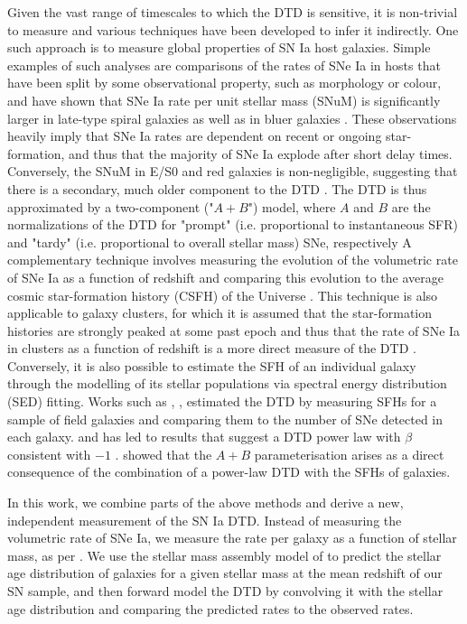 \documentclass[fleqn,usenatbib]{mnras}
\begin{document}
Given the vast range of timescales to which the DTD is sensitive, it is non-trivial to measure and various techniques have been developed to infer it indirectly. One such approach is to measure global properties of SN Ia host galaxies. Simple examples of such analyses are comparisons of the rates of SNe Ia in hosts that have been split by some observational property, such as morphology or colour, and have shown that SNe Ia rate per unit stellar mass (SNuM) is significantly larger in late-type spiral galaxies as well as in bluer galaxies \citep[e.g.][]{Mannucci2005}. These observations heavily imply that SNe Ia rates are dependent on recent or ongoing star-formation, and thus that the majority of SNe Ia explode after short delay times. Conversely, the SNuM in E/S0 and red galaxies is non-negligible, suggesting that there is a secondary, much older component to the DTD \citep{Sullivan2006,Smith2012}. The DTD is thus approximated by a two-component ("$A + B$") model, where $A$ and $B$ are the normalizations of the DTD for "prompt" (i.e. proportional to instantaneous SFR) and "tardy" (i.e. proportional to overall stellar mass) SNe, respectively A complementary technique involves measuring the evolution of the volumetric rate of SNe Ia as a function of redshift and comparing this evolution to the average cosmic star-formation history (CSFH) of the Universe \citep{Gal-Yam2004,Strolger2004,Dahlen2004,Dahlen2008}. This technique is also applicable to galaxy clusters, for which it is assumed that the star-formation histories are strongly peaked at some past epoch and thus that the rate of SNe Ia in clusters as a function of redshift is a more direct measure of the DTD \citep{Maoz2004,Graur2014,Maoz2014}. Conversely, it is also possible to estimate the SFH of an individual galaxy through the modelling of its stellar populations via spectral energy distribution (SED) fitting. Works such as \citet{Maoz2011}, \citet{Maoz2012}, \citet{Graur2013} estimated the DTD by measuring SFHs for a sample of field galaxies and comparing them to the number of SNe detected in each galaxy. and has led to results that suggest a DTD power law with $\beta$ consistent with $-1$ \citep[e.g.][]{Maoz2011,Graur2013}. \citet{Childress2014} showed that the $A+B$ parameterisation arises as a direct consequence of the combination of a power-law DTD with the SFHs of galaxies.

In this work, we combine parts of the above methods and derive a new, independent measurement of the SN Ia DTD. Instead of measuring the volumetric rate of SNe Ia, we measure the rate per galaxy as a function of stellar mass, as per \citet{Sullivan2006,Smith2012}. We use the stellar mass assembly model of \citet{Childress2014} to predict the stellar age distribution of galaxies for a given stellar mass at the mean redshift of our SN sample, and then forward model the DTD by convolving it with the stellar age distribution and comparing the predicted rates to the observed rates.
\end{document}
